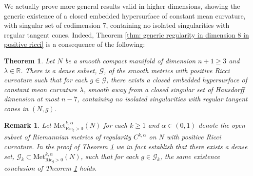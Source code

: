 \documentclass[11pt]{article}
\newtheorem{thm}{Theorem}
\newtheorem{rem}{Remark}
\begin{document}
We actually prove more general results valid in higher dimensions, showing the generic existence of a closed embedded hypersurface of constant mean curvature, with singular set of codimension $7$, containing no isolated singularities with regular tangent cones. Indeed, Theorem \ref{thm: generic regularity in dimension 8 in positive ricci} is a consequence of the following:

\begin{thm}\label{thm: generic removability of isolated singularities with regular cones in positive ricci}
Let $N$ be a smooth compact manifold of dimension $n+1 \geq 3$ and $\lambda \in \mathbb{R}$.  There is a dense subset, $\mathcal{G}$, of the smooth metrics with positive Ricci curvature such that for each $g \in \mathcal{G}$, there exists a closed embedded hypersurface of constant mean curvature $\lambda$, smooth away from a closed singular set of Hausdorff dimension at most $n-7$, containing no isolated singularities with regular tangent cones in $(N,g)$.
\end{thm}

\begin{rem}
Let $\mathrm{Met}_{\mathrm{Ric}_g > 0}^{k,\alpha}(N)$ for each $k \geq 1$ and $\alpha \in (0,1)$  denote the open subset of Riemannian metrics of regularity $C^{k,\alpha}$ on $N$ with positive Ricci curvature. In the proof of Theorem \ref{thm: generic removability of isolated singularities with regular cones in positive ricci} we in fact establish that there exists a dense set, $\mathcal{G}_k \subset \mathrm{Met}^{k,\alpha}_{\mathrm{Ric}_g > 0}(N)$, such that for each $g \in \mathcal{G}_k$, the same existence conclusion of Theorem \ref{thm: generic removability of isolated singularities with regular cones in positive ricci} holds.
\end{rem}
\end{document}

